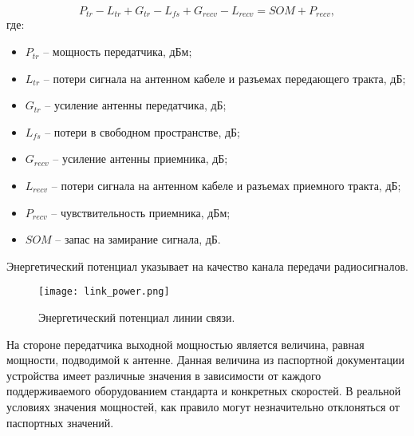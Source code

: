 

\begin{equation}
  \label{eq:part3_link_budget}
  P_{tr} - L_{tr} + G_{tr} - L_{fs} + G_{recv} - L_{recv} = SOM + P_{recv},
\end{equation}
где:

\begin{itemize}

  \item $P_{tr}$ -- мощность передатчика, дБм;

  \item $L_{tr}$ -- потери сигнала на антенном кабеле и разъемах передающего тракта, дБ;

  \item $G_{tr}$ -- усиление антенны передатчика, дБ;

  \item $L_{fs}$ -- потери в свободном пространстве, дБ;

  \item $G_{recv}$ -- усиление антенны приемника, дБ;

  \item $L_{recv}$ -- потери сигнала на антенном кабеле и разъемах приемного тракта, дБ;

  \item $P_{recv}$ -- чувствительность приемника, дБм;
  
  \item $SOM$ -- запас на замирание сигнала, дБ.

\end{itemize}
Энергетический потенциал указывает на качество канала передачи радиосигналов.

\begin{figure}[h!]
  \centering
   \texttt{[image: link\_power.png]}
\caption{Энергетический потенциал линии связи.}
\label{fig:link_power}
\end{figure}

На стороне передатчика выходной мощностью является величина, равная мощности, подводимой к антенне. Данная величина из паспортной документации устройства имеет различные значения в зависимости от каждого поддерживаемого оборудованием стандарта и конкретных скоростей. В реальной условиях значения мощностей, как правило могут незначительно отклоняться от паспортных значений. 

